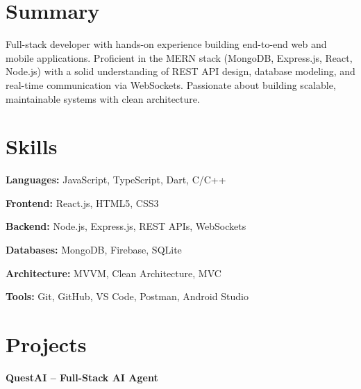 \documentclass[letterpaper,10pt]{article}
\begin{document}


\section{Summary}
\resumeSubHeadingListStart
\item{}
Full-stack developer with hands-on experience building end-to-end web and mobile applications. Proficient in the MERN stack (MongoDB, Express.js, React, Node.js) with a solid understanding of REST API design, database modeling, and real-time communication via WebSockets. Passionate about building scalable, maintainable systems with clean architecture.
\resumeSubHeadingListEnd

\section{Skills}
\begin{itemize}[leftmargin=0.15in, label={}, itemsep=0pt]
\small{
\item \textbf{Languages:} JavaScript, TypeScript, Dart, C/C++
\item \textbf{Frontend:} React.js, HTML5, CSS3
\item \textbf{Backend:} Node.js, Express.js, REST APIs, WebSockets
\item \textbf{Databases:} MongoDB, Firebase, SQLite
\item \textbf{Architecture:} MVVM, Clean Architecture, MVC
\item \textbf{Tools:} Git, GitHub, VS Code, Postman, Android Studio
}
\end{itemize}



\section{Projects}
\resumeSubHeadingListStart

\resumeProjectHeading
{\textbf{QuestAI -- Full-Stack AI Agent}}{}
\resumeItemListStart
{}
\resumeItemListEnd
\end{document}
